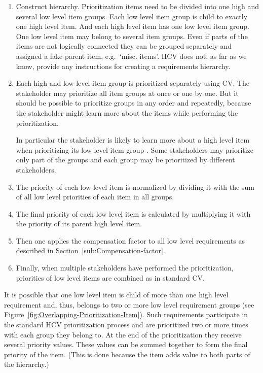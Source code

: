 \begin{enumerate}
\item Construct hierarchy. Prioritization items need to be divided into
one high and several low level item groups. Each low level item group
is child to exactly one high level item. And each high level item
has one low level item group. One low level item may belong to several
item groups. Even if parts of the items are not logically connected they
can be grouped separately and assigned a fake parent item, e.g.\ `misc.
items'. HCV does not, as far as we know, provide any instructions for 
creating a requirements hierarchy.

\item Each high and low level item group is prioritized separately using
CV. The stakeholder may prioritize all item groups at once or one by one.
But it should be possible to prioritize groups in any order and repeatedly,
because the stakeholder might learn more about the items while performing the prioritization.

In particular the stakeholder is likely to learn more about a high level item when
prioritizing its low level item group \cite{Berander2009a}. Some stakeholders
may prioritize only part of the groups and each group may be prioritized
by different stakeholders.

\item The priority of each low level item is normalized by dividing it with
the sum of all low level priorities of each item in all groups.


\item The final priority of each low level item is calculated by multiplying
it with the priority of its parent high level item.

\item Then one applies the compensation factor to all low level requirements as described
in Section~\ref{sub:Compensation-factor}.

\item Finally, when multiple stakeholders have performed the prioritization, priorities
of low level items are combined as in standard CV.
\end{enumerate}

It is possible that one low level item is child of more than one high
level requirement and, thus, belongs to two or more low level requirement
groups (see Figure~\ref{fig:Overlapping-Prioritization-Item}). Such
requirements participate in the standard HCV prioritization process and
are prioritized two or more times with each group they belong to.
At the end of the prioritization they receive several priority values.
These values can be summed together to form the final priority of the item.
(This is done because the item adds value to both parts of the hierarchy.)

